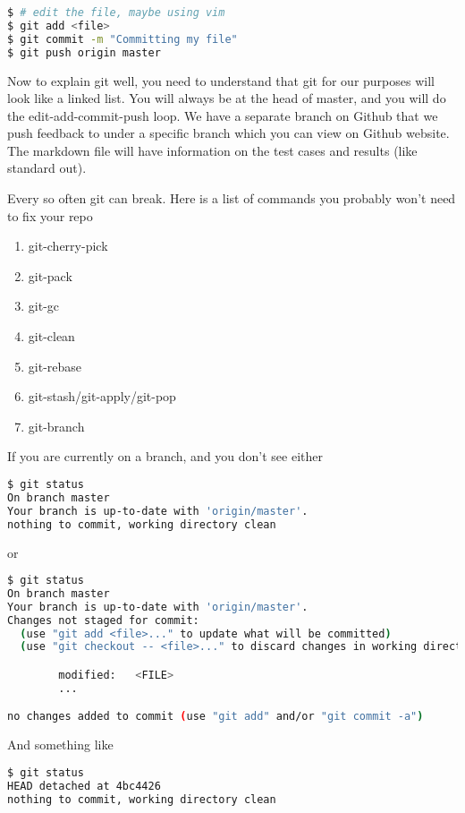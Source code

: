 \begin{lstlisting}[language=bash]
$ # edit the file, maybe using vim
$ git add <file>
$ git commit -m "Committing my file"
$ git push origin master
\end{lstlisting}

Now to explain git well, you need to understand that git for our purposes will look like a linked list.
You will always be at the head of master, and you will do the edit-add-commit-push loop. We have a separate branch on Github that we push feedback to under a specific branch which you can view on Github website. The markdown file will have information on the test cases and results (like standard out).

Every so often git can break. Here is a list of commands you probably won't need to fix your repo

\begin{enumerate}
\item git-cherry-pick
\item git-pack
\item git-gc
\item git-clean
\item git-rebase
\item git-stash/git-apply/git-pop
\item git-branch
\end{enumerate}

If you are currently on a branch, and you don't see either

\begin{lstlisting}[language=bash]
$ git status
On branch master
Your branch is up-to-date with 'origin/master'.
nothing to commit, working directory clean
\end{lstlisting}

or

\begin{lstlisting}[language=bash]
$ git status
On branch master
Your branch is up-to-date with 'origin/master'.
Changes not staged for commit:
  (use "git add <file>..." to update what will be committed)
  (use "git checkout -- <file>..." to discard changes in working directory)

        modified:   <FILE>
        ...

no changes added to commit (use "git add" and/or "git commit -a")
\end{lstlisting}

And something like

\begin{lstlisting}[language=bash]
$ git status
HEAD detached at 4bc4426
nothing to commit, working directory clean
\end{lstlisting}

